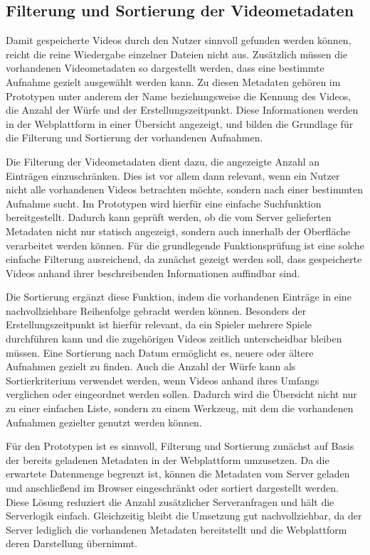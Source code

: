 \subsection{Filterung und Sortierung der Videometadaten} 

Damit gespeicherte Videos durch den Nutzer sinnvoll gefunden werden können, reicht die reine Wiedergabe einzelner Dateien nicht aus. Zusätzlich müssen die vorhandenen Videometadaten so dargestellt werden, dass eine bestimmte Aufnahme gezielt ausgewählt werden kann. 
Zu diesen Metadaten gehören im Prototypen unter anderem der Name beziehungsweise die Kennung des Videos, die Anzahl der Würfe und der Erstellungszeitpunkt. Diese Informationen werden in der Webplattform in einer Übersicht angezeigt,
 und bilden die Grundlage für die Filterung und Sortierung der vorhandenen Aufnahmen. 

Die Filterung der Videometadaten dient dazu, die angezeigte Anzahl an Einträgen einzuschränken. Dies ist vor allem dann relevant, wenn ein Nutzer nicht alle vorhandenen Videos betrachten möchte, sondern nach einer bestimmten Aufnahme sucht. Im Prototypen wird hierfür eine einfache Suchfunktion bereitgestellt. 
Dadurch kann geprüft werden, ob die vom Server gelieferten Metadaten nicht nur statisch angezeigt, sondern auch innerhalb der Oberfläche verarbeitet werden können. Für die grundlegende Funktionsprüfung ist eine solche einfache Filterung ausreichend, da zunächst gezeigt werden soll, 
dass gespeicherte Videos anhand ihrer beschreibenden Informationen auffindbar sind. 

Die Sortierung ergänzt diese Funktion, indem die vorhandenen Einträge in eine nachvollziehbare Reihenfolge gebracht werden können. Besonders der Erstellungszeitpunkt ist hierfür relevant, da ein Spieler mehrere Spiele durchführen kann und die zugehörigen Videos zeitlich unterscheidbar bleiben müssen. 
Eine Sortierung nach Datum ermöglicht es, neuere oder ältere Aufnahmen gezielt zu finden. Auch die Anzahl der Würfe kann als Sortierkriterium verwendet werden, wenn Videos anhand ihres Umfangs verglichen oder eingeordnet werden sollen. Dadurch wird die Übersicht nicht nur zu einer einfachen Liste, 
sondern zu einem Werkzeug, mit dem die vorhandenen Aufnahmen gezielter genutzt werden können. 

Für den Prototypen ist es sinnvoll, Filterung und Sortierung zunächst auf Basis der bereits geladenen Metadaten in der Webplattform umzusetzen. Da die erwartete Datenmenge begrenzt ist, können die Metadaten vom Server geladen und anschließend im Browser eingeschränkt oder sortiert dargestellt werden. 
Diese Lösung reduziert die Anzahl zusätzlicher Serveranfragen und hält die Serverlogik einfach. Gleichzeitig bleibt die Umsetzung gut nachvollziehbar, da der Server lediglich die vorhandenen Metadaten bereitstellt und die Webplattform deren Darstellung übernimmt. 

